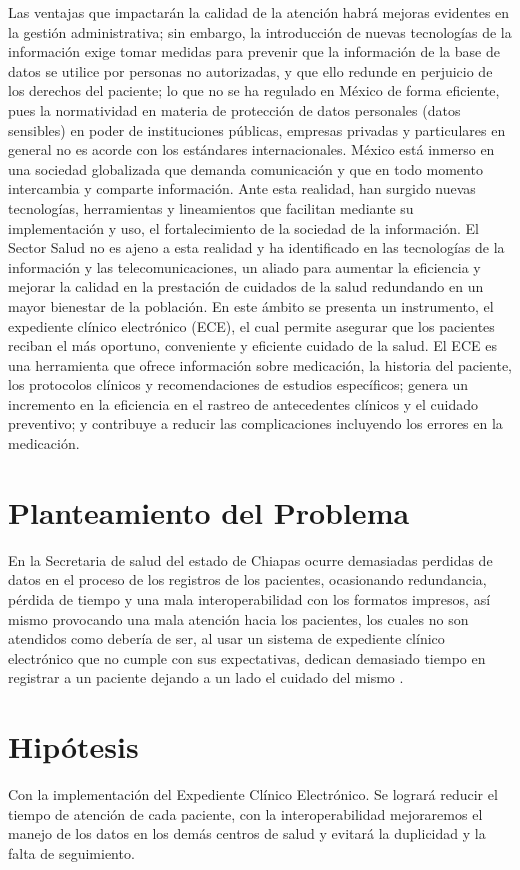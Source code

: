 Las ventajas que impactarán la calidad de la atención habrá mejoras evidentes en la gestión administrativa; sin embargo, la introducción de nuevas tecnologías de la información exige tomar medidas para prevenir que la información de la base de datos se utilice por personas no autorizadas, y que ello redunde en perjuicio de los derechos del paciente; lo que no se ha regulado en México de forma eficiente, pues la normatividad en materia de protección de datos personales (datos sensibles) en poder de instituciones públicas, empresas privadas y particulares en general no es acorde con los estándares internacionales. México está inmerso en una sociedad globalizada que demanda comunicación y que en todo momento intercambia y comparte información. Ante esta realidad, han surgido nuevas tecnologías, herramientas y lineamientos que facilitan mediante su implementación y uso, el fortalecimiento de la sociedad de la información. El Sector Salud no es ajeno a esta realidad y ha identificado en las tecnologías de la información y las telecomunicaciones, un aliado para aumentar la eficiencia y mejorar la calidad en la prestación de cuidados de la salud redundando en un mayor bienestar de la población. En este ámbito se presenta un instrumento, el expediente clínico electrónico (ECE), el cual permite asegurar que los pacientes reciban el más oportuno, conveniente y eficiente cuidado de la salud. El ECE es una herramienta que ofrece información sobre medicación, la historia del paciente, los protocolos clínicos y recomendaciones de estudios específicos; genera un incremento en la eficiencia en el rastreo de antecedentes clínicos y el cuidado preventivo; y contribuye a reducir las complicaciones incluyendo los errores en la medicación.


\section{Planteamiento del Problema}
En la Secretaria de salud del estado de Chiapas ocurre demasiadas perdidas de datos en el proceso de los registros de los pacientes, ocasionando redundancia, pérdida de tiempo y una mala interoperabilidad con los formatos impresos, así mismo provocando una mala atención hacia los pacientes, los cuales no son atendidos como debería de ser, al usar un sistema de expediente clínico electrónico que no cumple con sus expectativas, dedican demasiado tiempo en registrar a un paciente dejando a un  lado el cuidado del mismo .

\section{Hipótesis}
Con la implementación del Expediente Clínico Electrónico. Se logrará reducir el tiempo de atención de cada paciente, con la interoperabilidad mejoraremos el manejo de los datos en los demás centros de salud y evitará la duplicidad y la falta de seguimiento.

